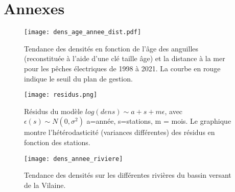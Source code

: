 \documentclass[10pt,twocolumn,titlepage,twoside]{article}\usepackage[]{graphicx}\usepackage[]{color}
\begin{document}
\section{Annexes}
\small

\normalsize
\begin{figure}[htbp]
\centering
\texttt{[image: dens\_age\_annee\_dist.pdf]}
\caption[Densité par âge et distance.]{Tendance des
densités en fonction de l'âge des anguilles (reconstituée à l'aide d'une clé
taille âge) et la distance à la mer pour les pêches électriques de 1998 à 2021.
La courbe en rouge indique le seuil du plan de gestion.}
\label{dens_age_annee_dist}
\end{figure}


\begin{figure}[htbp]
\centering
\texttt{[image: residus.png]}
\caption[Tendance des densités modèle]{Résidus du modèle $log(dens) \sim a +s +m
\epsilon$, avec $\epsilon(s) \sim N(0,\sigma^2)$ a=année, s=stations, m = mois.
Le graphique montre l'hétérodasticité (variances différentes) des résidus en
fonction des stations.}
\label{residus}
\end{figure}

\begin{figure}[htbp]
\centering
 \texttt{[image: dens\_annee\_riviere]}
\caption[Tendance des densités par rivières]{Tendance des densités sur les
différentes rivières du bassin versant de la Vilaine.}
\label{dens_annee_riviere}
\end{figure}
\end{document}
